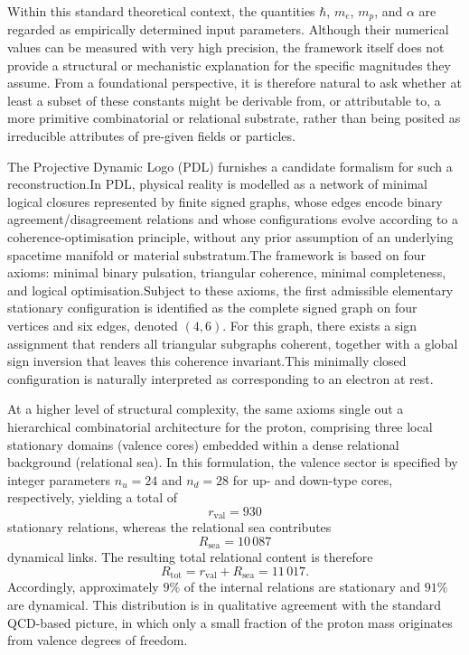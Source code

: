 \documentclass[12pt,a4paper]{article}
\begin{document}
Within this standard theoretical context, the quantities \(\hbar\), \(m_e\), \(m_p\), and \(\alpha\) are regarded as empirically determined input parameters. Although their numerical values can be measured with very high precision, the framework itself does not provide a structural or mechanistic explanation for the specific magnitudes they assume. From a foundational perspective, it is therefore natural to ask whether at least a subset of these constants might be derivable from, or attributable to, a more primitive combinatorial or relational substrate, rather than being posited as irreducible attributes of pre-given fields or particles.

The Projective Dynamic Logo (PDL) furnishes a candidate formalism for such a reconstruction.\cite{Laubscher2026IntroPDL,Laubscher2026PDL_English,Laubscher2026LDP_French}In PDL, physical reality is modelled as a network of minimal logical closures represented by finite signed graphs, whose edges encode binary agreement/disagreement relations and whose configurations evolve according to a coherence-optimisation principle, without any prior assumption of an underlying spacetime manifold or material substratum.The framework is based on four axioms: minimal binary pulsation, triangular coherence, minimal completeness, and logical optimisation.Subject to these axioms, the first admissible elementary stationary configuration is identified as the complete signed graph on four vertices and six edges, denoted \((4,6)\). For this graph, there exists a sign assignment that renders all triangular subgraphs coherent, together with a global sign inversion that leaves this coherence invariant.This minimally closed configuration is naturally interpreted as corresponding to an electron at rest.

At a higher level of structural complexity, the same axioms single out a hierarchical combinatorial architecture for the proton, comprising three local stationary domains (valence cores) embedded within a dense relational background (relational sea). In this formulation, the valence sector is specified by integer parameters \(n_u = 24\) and \(n_d = 28\) for up- and down-type cores, respectively, yielding a total of
\[
  r_{\text{val}} = 930
\]
stationary relations, whereas the relational sea contributes
\[
  R_{\text{sea}} = 10\,087
\]
dynamical links. The resulting total relational content is therefore
\[
  R_{\text{tot}} = r_{\text{val}} + R_{\text{sea}} = 11\,017.
\]
Accordingly, approximately \(9\%\) of the internal relations are stationary and \(91\%\) are dynamical. This distribution is in qualitative agreement with the standard QCD-based picture, in which only a small fraction of the proton mass originates from valence degrees of freedom.\cite{Laubscher2026PDL_English,Laubscher2026LDP_French}
\end{document}
